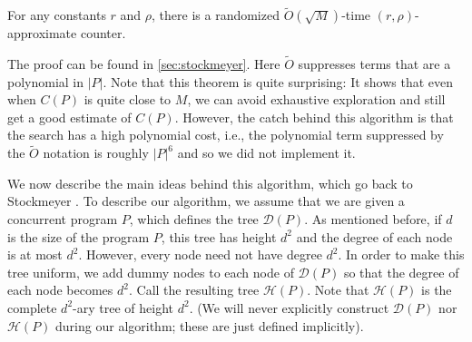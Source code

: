 \documentclass[acmsmall]{acmart}
\def\RM#1{{\textcolor{red}{\textbf{RM:} #1}}}
\renewcommand{\RM}[1]{}
\begin{document}

\begin{theorem}
\label{th:stockmeyer}
    For any constants $r$ and $\rho$, there is a randomized $\tilde{O}(\sqrt{M})$-time $(r, \rho)$-approximate counter.
\end{theorem}

The proof can be found in \cref{sec:stockmeyer}.
Here $\tilde{O}$ suppresses terms that are a polynomial in $|P|$. Note that this theorem is quite surprising: 
It shows that even when $C(P)$ is quite close to $M$, we can avoid exhaustive exploration and still get a good estimate of $C(P)$. 
However, the catch behind this algorithm is that the search has a high polynomial cost, i.e., the polynomial term suppressed by the $\tilde{O}$ notation is roughly $|P|^6$ and so we did not implement it.

We now describe the main ideas behind this algorithm, which go back to Stockmeyer \cite{Stockmeyer85}.
To describe our algorithm, we assume that we are given a concurrent program $P$, 
which defines the tree $\mathcal{D}(P)$. 
As mentioned before, if $d$ is the size of the program $P$, 
this tree has height $d^2$ and the degree of each node is at most $d^2$. 
However, every node need not have degree $d^2$. In order to make this tree uniform, we add dummy nodes to each node of $\mathcal{D}(P)$ so that the degree of each node becomes $d^2$. 
Call the resulting tree $\mathcal{H}(P)$. Note that $\mathcal{H}(P)$ 
is the complete $d^2$-ary tree of height $d^2$. 
(We will never explicitly construct $\mathcal{D}(P)$ nor $\mathcal{H}(P)$ during our algorithm; 
these are just defined implicitly). 
\end{document}
